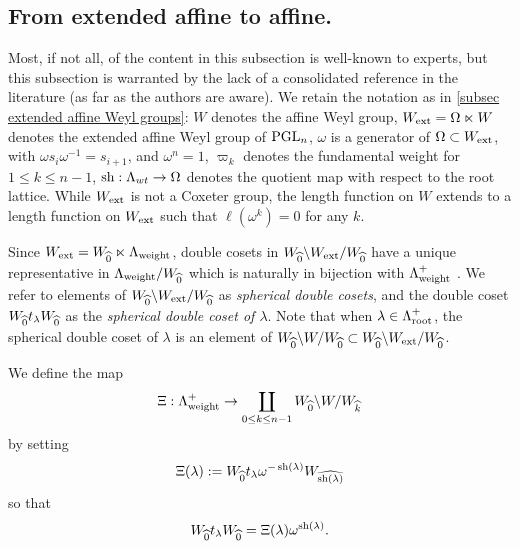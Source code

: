 

\subsection{From extended affine to affine.}\label{subsec extended affine to affine}
Most, if not all, of the content in this subsection is well-known to experts, but this subsection is warranted by the lack of a consolidated reference in the literature (as far as the authors are aware).
We retain the notation as in \cref{subsec extended affine Weyl groups}:
$W$ denotes the affine Weyl group, $W_{\operatorname{ext}}=\Omega \ltimes W $ denotes the extended affine Weyl group of $\operatorname{PGL}_n$, $\omega$ is a generator of $\Omega \subset W_{\operatorname{ext}}$, with $\omega s_i \omega^{-1}=s_{i+1}$, and $\omega^n=1$, $\varpi_k$ denotes the fundamental weight for $1\leq k \leq n-1$, $\operatorname{sh}: \Lambda_{wt} \rightarrow \Omega$ denotes the quotient map with respect to the root lattice.
While $W_{\operatorname{ext}}$ is not a Coxeter group, the length function on $W$ extends to a length function on $W_{\operatorname{ext}}$ such that $\ell(\omega^k)=0$ for any $k$.



Since $W_{\operatorname{ext}}= W_{\widehat{0}}\ltimes\Lambda_{\operatorname{weight}}$, double cosets in
$W_{\widehat{0}}\backslash W_{\operatorname{ext}}/W_{\widehat{0}}$ have a unique representative in $\Lambda_{\operatorname{weight}}/W_{\widehat{0}}$ which is naturally in bijection with $\Lambda_{\operatorname{weight}}^+$ . 
We refer to elements of $W_{\widehat{0}}\backslash W_{\operatorname{ext}}/W_{\widehat{0}}$  as \emph{spherical double cosets}, and the double coset $W_{\widehat{0}}t_{\lambda}W_{\widehat{0}}$ as the \emph{spherical double coset of $\lambda$}.
Note that when $\lambda \in \Lambda_{\operatorname{root}}^+$, the spherical double  coset of $\lambda$ is an element of $W_{\widehat{0}}\backslash W/W_{\widehat{0}} \subset W_{\widehat{0}}\backslash W_{\operatorname{ext}}/W_{\widehat{0}}$.

\begin{defn}\label{defn the map Xi}
    We define the map 
    \begin{equation}\Xi: \Lambda_{\operatorname{weight}}^+ \rightarrow \coprod_{0 \leq k\leq n-1} W_{\widehat{0}}\backslash W/W_{\widehat{k}}\end{equation}
    by setting 
    \begin{equation}\Xi(\lambda):=W_{\widehat{0}}t_{\lambda}\omega^{-\operatorname{sh}(\lambda)}W_{\widehat{\operatorname{sh}(\lambda)}}
    \end{equation}   
    so that 
    \begin{equation}
        W_{\widehat{0}}t_{\lambda}W_{\widehat{0}}= \Xi(\lambda)\omega^{\operatorname{sh}(\lambda)}.
    \end{equation}
\end{defn}

